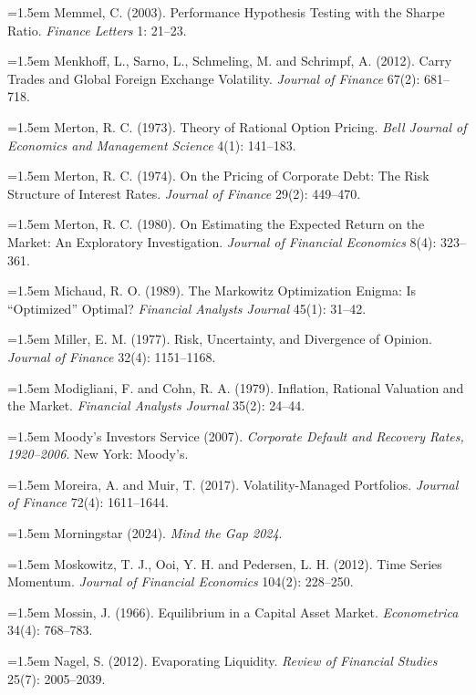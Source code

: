 \hangindent=1.5em Memmel, C. (2003). Performance Hypothesis Testing with the Sharpe Ratio. \emph{Finance Letters} 1: 21--23.

\hangindent=1.5em Menkhoff, L., Sarno, L., Schmeling, M. and Schrimpf, A. (2012). Carry Trades and Global Foreign Exchange Volatility. \emph{Journal of Finance} 67(2): 681--718.

\hangindent=1.5em Merton, R. C. (1973). Theory of Rational Option Pricing. \emph{Bell Journal of Economics and Management Science} 4(1): 141--183.

\hangindent=1.5em Merton, R. C. (1974). On the Pricing of Corporate Debt: The Risk Structure of Interest Rates. \emph{Journal of Finance} 29(2): 449--470.

\hangindent=1.5em Merton, R. C. (1980). On Estimating the Expected Return on the Market: An Exploratory Investigation. \emph{Journal of Financial Economics} 8(4): 323--361.

\hangindent=1.5em Michaud, R. O. (1989). The Markowitz Optimization Enigma: Is ``Optimized'' Optimal? \emph{Financial Analysts Journal} 45(1): 31--42.

\hangindent=1.5em Miller, E. M. (1977). Risk, Uncertainty, and Divergence of Opinion. \emph{Journal of Finance} 32(4): 1151--1168.

\hangindent=1.5em Modigliani, F. and Cohn, R. A. (1979). Inflation, Rational Valuation and the Market. \emph{Financial Analysts Journal} 35(2): 24--44.

\hangindent=1.5em Moody's Investors Service (2007). \emph{Corporate Default and Recovery Rates, 1920--2006}. New York: Moody's.

\hangindent=1.5em Moreira, A. and Muir, T. (2017). Volatility-Managed Portfolios. \emph{Journal of Finance} 72(4): 1611--1644.

\hangindent=1.5em Morningstar (2024). \emph{Mind the Gap 2024}.

\hangindent=1.5em Moskowitz, T. J., Ooi, Y. H. and Pedersen, L. H. (2012). Time Series Momentum. \emph{Journal of Financial Economics} 104(2): 228--250.

\hangindent=1.5em Mossin, J. (1966). Equilibrium in a Capital Asset Market. \emph{Econometrica} 34(4): 768--783.

\hangindent=1.5em Nagel, S. (2012). Evaporating Liquidity. \emph{Review of Financial Studies} 25(7): 2005--2039.

